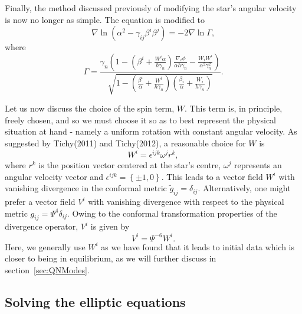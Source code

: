 {Finally, the method discussed previously of modifying the star's
angular velocity is now no longer as simple. The equation is modified
to
 \begin{equation}
\nabla\ln\left(\alpha^2-\gamma_{ij}\beta^{i}\beta^{j}\right)=-2\nabla\ln\Gamma,
\end{equation}
where
\begin{equation}
\Gamma
=\frac{\gamma_n\left(1-\left(\beta^i+\frac{W^i\alpha}{h\gamma_n}\right)\frac{\nabla_i\phi}{\alpha
    h\gamma_n}- \frac{W_i W^i}{\alpha^2\gamma_n^2}\right) } { \sqrt{ 1
    - \left(\frac{\beta^i}{\alpha}+\frac{W^i}{h\gamma_n}\right)
    \left(\frac{\beta_i}{\alpha}+\frac{W_i}{h\gamma_n}\right) } } .
\end{equation}

Let us now discuss the choice of the spin term, $W$. This term is, in
principle, freely chosen, and so we must choose it so as to best
represent the physical situation at hand - namely a uniform rotation
with constant angular velocity. As suggested by Tichy(2011)\cite{Tichy:2011gw} and
Tichy(2012)\cite{Tichy:2012rp}, a reasonable choice for $W$ is 
\begin{equation}
\label{eq:UniformRotation}
W^i = \epsilon^{ijk}\omega^{j}r^k,
\end{equation}
where $r^k$ is the position vector centered at the star's centre,
$\omega^j$ represents an angular velocity vector and $\epsilon^{ijk}=\left\{\pm 1,0\right\}$. This leads to a vector field $W^i$ with vanishing divergence in the conformal metric $\tilde{g}_{ij}=\delta_{ij}$. Alternatively, one might prefer a vector field $V^i$ with vanishing divergence with respect to the physical metric $g_{ij}=\Psi^4\delta_{ij}$. Owing to the conformal transformation properties of the divergence operator, $V^i$ is given by
\begin{equation}
\label{eq:ConformalUniformRotation}
V^i=\Psi^{-6}W^i.
\end{equation}
Here, we generally use $W^i$ as we have found that it leads to initial data which is closer to being in equilibrium, as we will further discuss in section~\ref{sec:QNModes}.


\subsection{Solving the elliptic equations}


}

